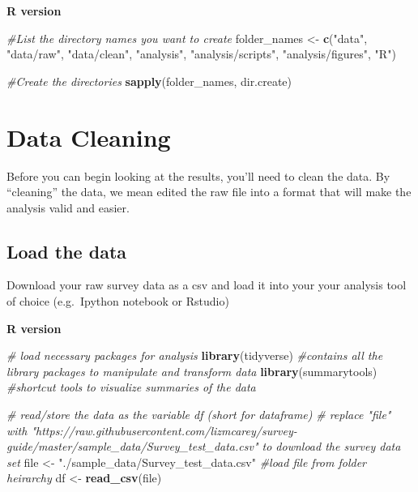 \documentclass[]{book}
\newenvironment{Shaded}{\begin{snugshade}}{\end{snugshade}}
\newcommand{\KeywordTok}[1]{\textcolor[rgb]{0.13,0.29,0.53}{\textbf{#1}}}
\newcommand{\StringTok}[1]{\textcolor[rgb]{0.31,0.60,0.02}{#1}}
\newcommand{\CommentTok}[1]{\textcolor[rgb]{0.56,0.35,0.01}{\textit{#1}}}
\newcommand{\NormalTok}[1]{#1}
\begin{document}
\textbf{R version}

\begin{Shaded}
\begin{Highlighting}[]
\CommentTok{#List the directory names you want to create}
\NormalTok{folder_names <-}\StringTok{ }\KeywordTok{c}\NormalTok{(}\StringTok{"data"}\NormalTok{, }
                    \StringTok{"data/raw"}\NormalTok{, }
                    \StringTok{"data/clean"}\NormalTok{, }
                  \StringTok{"analysis"}\NormalTok{, }
                    \StringTok{"analysis/scripts"}\NormalTok{, }
                     \StringTok{"analysis/figures"}\NormalTok{, }
                  \StringTok{"R"}\NormalTok{)}

\CommentTok{#Create the directories}
\KeywordTok{sapply}\NormalTok{(folder_names, dir.create)}
\end{Highlighting}
\end{Shaded}

\section{Data Cleaning}\label{data-cleaning}

Before you can begin looking at the results, you'll need to clean the
data. By ``cleaning'' the data, we mean edited the raw file into a
format that will make the analysis valid and easier.

\subsection{Load the data}\label{load-the-data}

Download your raw survey data as a csv and load it into your your
analysis tool of choice (e.g.~Ipython notebook or Rstudio)

\textbf{R version}

\begin{Shaded}
\begin{Highlighting}[]
\CommentTok{# load necessary packages for analysis}
\KeywordTok{library}\NormalTok{(tidyverse)        }\CommentTok{#contains all the library packages to manipulate and transform data}
\KeywordTok{library}\NormalTok{(summarytools)     }\CommentTok{#shortcut tools to visualize summaries of the data}

\CommentTok{# read/store the data as the variable df (short for dataframe)}
\CommentTok{# replace "file" with "https://raw.githubusercontent.com/lizmcarey/survey-guide/master/sample_data/Survey_test_data.csv" to download the survey data set}
\NormalTok{file <-}\StringTok{ "./sample_data/Survey_test_data.csv"} \CommentTok{#load file from folder heirarchy }
\NormalTok{df <-}\StringTok{ }\KeywordTok{read_csv}\NormalTok{(file)}
\end{Highlighting}
\end{Shaded}
\end{document}
